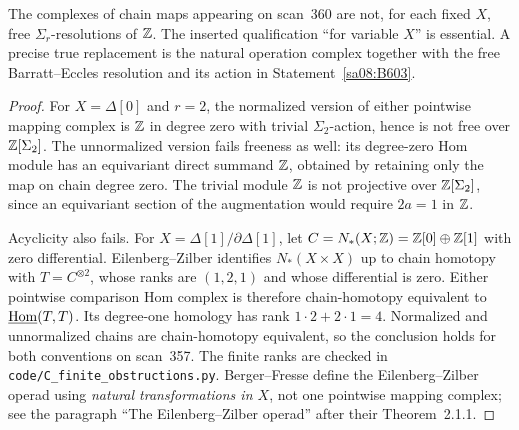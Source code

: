\begin{proposition}\label{sa08:B604}
The complexes of chain maps appearing on scan~360 are not, for
each fixed $X$, free $\Sigma_r$-resolutions of $\mathbb Z$. The inserted
qualification ``for variable $X$'' is essential. A precise true
replacement is the natural operation complex together with the
free Barratt--Eccles resolution and its action in
Statement~\ref{sa08:B603}.
\end{proposition}
\begin{proof}
For $X=\Delta[0]$ and $r=2$, the normalized version of either
pointwise mapping complex is $\mathbb Z$ in degree zero with trivial
$\Sigma_2$-action, hence is not free over $\mathbb Z[\Sigma_2]$.
The unnormalized version fails freeness as well: its degree-zero
Hom module has an equivariant direct summand $\mathbb Z$, obtained by
retaining only the map on chain degree zero. The trivial module
$\mathbb Z$ is not projective over $\mathbb Z[\Sigma_2]$, since an equivariant
section of the augmentation would require $2a=1$ in $\mathbb Z$.

Acyclicity also fails. For
$X=\Delta[1]/\partial\Delta[1]$, let $C=N_*(X;\mathbb Z)
=\mathbb Z[0]\oplus\mathbb Z[1]$ with zero differential. Eilenberg--Zilber
identifies $N_*(X\times X)$ up to chain homotopy with
$T=C^{\otimes2}$, whose ranks are $(1,2,1)$ and whose differential
is zero. Either pointwise comparison Hom complex is therefore
chain-homotopy equivalent to $\underline{\operatorname{Hom}}(T,T)$.
Its degree-one homology has rank
$1\cdot2+2\cdot1=4$. Normalized and unnormalized chains are
chain-homotopy equivalent, so the conclusion holds for both
conventions on scan~357. The finite ranks are checked in
\texttt{code/C\_finite\_obstructions.py}. Berger--Fresse define
the Eilenberg--Zilber operad using \emph{natural transformations in
$X$}, not one pointwise mapping complex; see the paragraph
``The Eilenberg--Zilber operad'' after their Theorem~2.1.1.
\end{proof}
